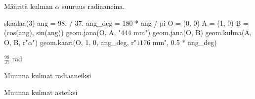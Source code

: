 \begin{tehtavasivu}
\begin{tehtava}
Määritä kulman $\alpha$ suuruus radiaaneina.

\begin{kuva}
skaalaa(3)
ang = 98. / 37.
ang_deg = 180 * ang / pi
O = (0, 0)
A = (1, 0)
B = (cos(ang), sin(ang))
geom.jana(O, A, "$444$ mm")
geom.jana(O, B)
geom.kulma(A, O, B, r"$\alpha$")
geom.kaari(O, 1, 0, ang_deg, r"$1176$ mm", 0.5 * ang_deg)
\end{kuva}

\begin{vastaus}
$\frac{98}{37}$ rad
\end{vastaus}
\end{tehtava}

\begin{tehtava}
Muunna kulmat radiaaneiksi
\begin{alakohdat}
\end{alakohdat}

\begin{vastaus}
\begin{alakohdat}
\end{alakohdat}
\end{vastaus}
\end{tehtava}

\begin{tehtava}
Muunna kulmat asteiksi
\begin{alakohdat}
\end{alakohdat}

\begin{vastaus}
\begin{alakohdat}
\end{alakohdat}
\end{vastaus}
\end{tehtava}

\end{tehtavasivu}
